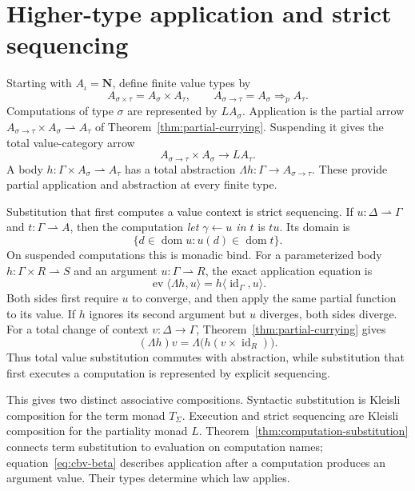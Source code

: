 \documentclass[11pt]{article}
\theoremstyle{definition}
\newcommand{\dom}{\operatorname{dom}}
\newcommand{\id}{\operatorname{id}}
\newcommand{\ev}{\operatorname{ev}}
\newcommand{\pArr}{\mathbin{\Rightarrow_{\!p}}}
\begin{document}
\section{Higher-type application and strict sequencing}

Starting with $A_\iota=\mathbf N$, define finite value types by
\[
 A_{\sigma\times\tau}=A_\sigma\times A_\tau,
 \qquad A_{\sigma\to\tau}=A_\sigma\pArr A_\tau.
\]
Computations of type $\sigma$ are represented by $LA_\sigma$.
Application is the partial arrow
$A_{\sigma\to\tau}\times A_\sigma\rightharpoonup A_\tau$
of Theorem~\ref{thm:partial-currying}. Suspending it gives the
total value-category arrow
\[
 A_{\sigma\to\tau}\times A_\sigma\longrightarrow LA_\tau.
\]
A body $h:\Gamma\times A_\sigma\rightharpoonup A_\tau$
has a total abstraction $\Lambda h:\Gamma\to A_{\sigma\to\tau}$.
These provide partial application and abstraction at every finite type.

Substitution that first computes a value context is strict sequencing. If
$u:\Delta\rightharpoonup\Gamma$ and
$t:\Gamma\rightharpoonup A$, then the computation
\emph{let $\gamma\leftarrow u$ in $t$} is $tu$. Its domain is
\[
 \{d\in\dom u:u(d)\in\dom t\}.
\]
On suspended computations this is monadic bind. For a parameterized
body $h:\Gamma\times R\rightharpoonup S$ and an argument
$u:\Gamma\rightharpoonup R$, the exact application equation is
\begin{equation}\label{eq:cbv-beta}
 \ev\langle\Lambda h,u\rangle
       =h\langle\id_\Gamma,u\rangle.
\end{equation}
Both sides first require $u$ to converge, and then apply the same
partial function to its value. If $h$ ignores its second argument
but $u$ diverges, both sides diverge. For a total change of context
$v:\Delta\to\Gamma$, Theorem~\ref{thm:partial-currying} gives
\[
 (\Lambda h)v=\Lambda\bigl(h(v\times\id_R)\bigr).
\]
Thus total value substitution commutes with abstraction, while
substitution that first executes a computation is represented by
explicit sequencing.

This gives two distinct associative compositions. Syntactic
substitution is Kleisli composition for the term monad $T_\Sigma$.
Execution and strict sequencing are Kleisli composition for the
partiality monad $L$. Theorem~\ref{thm:computation-substitution}
connects term substitution to evaluation on computation names;
equation~\eqref{eq:cbv-beta} describes application after a computation
produces an argument value. Their types determine which law applies.
\end{document}
